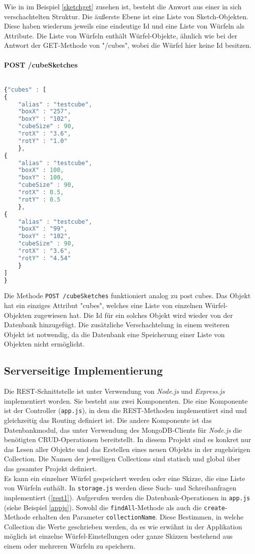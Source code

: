 \documentclass[12pt, ngerman, utf8]{article}
\begin{document}
Wie in im Beispiel \ref{sketchget} zusehen ist, besteht die Anwort aus einer in sich verschachtelten Struktur. Die äußerste Ebene ist eine Liste von Sketch-Objekten. Diese haben wiederum jeweils eine eindeutige Id und eine Liste von Würfeln als Attribute. Die Liste von Würfeln enthält Würfel-Objekte, ähnlich wie bei der Antwort der GET-Methode von "/cubes", wobei die Würfel hier keine Id besitzen.
\\\\
\textbf{POST /cubeSketches}\\\\
\begin{lstlisting}[language=JavaScript, caption={Request-Body der POST-Operation auf "/cubeSketches"},label={sketchpost}]
{"cubes" : [ 
{ 
	"alias" : "testcube", 
	"boxX" : "257", 
	"boxY" : "102", 
	"cubeSize" : 90, 
	"rotX" : "3.6",
	"rotY" : "1.0"
	},
{
	"alias" : "testcube",
	"boxX" : 100,
	"boxY" : 100,
	"cubeSize" : 90,
	"rotX" : 0.5,
	"rotY" : 0.5
	},
{
	"alias" : "testcube",
	"boxX" : "99",
	"boxY" : "102",
	"cubeSize" : 90,
	"rotX" : "3.6",
	"rotY" : "4.54"
	} 
]
}
\end{lstlisting}
Die Methode \texttt{POST /cubeSketches} funktioniert analog zu post cubes. Das Objekt hat ein einziges Attribut "cubes", welches eine Liste von einzelnen Würfel-Objekten zugewiesen hat.
Die Id für ein solches Objekt wird wieder von der Datenbank hinzugefügt.
Die zusätzliche Verschachtelung in einem weiteren Objekt ist notwendig, da die Datenbank eine Speicherung einer Liste von Objekten nicht ermöglicht.

\subsection{Serverseitige Implementierung}
Die REST-Schnittstelle ist unter Verwendung von \emph{Node.js} und \emph{Express.js} implementiert worden. Sie besteht aus zwei Komponenten. Die eine Komponente ist der Controller (\texttt{app.js}), in dem die REST-Methoden implementiert sind und gleichzeitig das Routing definiert ist. Die andere Komponente ist das Datenbankmodul, das unter Verwendung des MongoDB-Clients für \emph{Node.js} die benötigten CRUD-Operationen bereitstellt. In diesem Projekt sind es konkret nur das Lesen aller Objekte und das Erstellen eines neuen Objekts in der zugehörigen Collection. Die Namen der jeweiligen Collections sind statisch und global über das gesamter Projekt definiert.\\
Es kann ein einzelner Würfel gespeichert werden oder eine Skizze, die eine Liste von Würfeln enthält. In \texttt{storage.js} werden diese Such- und Schreibanfragen implementiert (\ref{rest1}). 
Aufgerufen werden die Datenbank-Operationen in \texttt{app.js} (siehe Beispiel \ref{appjs}). Sowohl die \texttt{findAll}-Methode als auch die \texttt{create}-Methode erhalten den Parameter \texttt{collectionName}. Diese Bestimmen, in welche Collection die Werte geschrieben werden, da es wie erwähnt in der Applikation möglich ist einzelne Würfel-Einstellungen oder ganze Skizzen bestehend aus einem oder mehreren Würfeln zu speichern.\\\\
\end{document}
